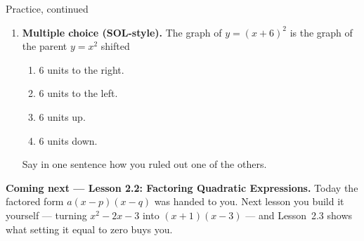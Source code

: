 \documentclass[12pt]{article}
\begin{document}
\begin{notesbox}{Practice, continued}
\begin{enumerate}[leftmargin=1.9em, itemsep=8pt, start=4]
  \item \textbf{Multiple choice (SOL-style).} The graph of $y=(x+6)^2$ is the graph of the parent
        $y=x^2$ shifted
    \begin{enumerate}[label=\Alph*., leftmargin=2.2em, itemsep=1pt]
      \item $6$ units to the right.
      \item $6$ units to the left.
      \item $6$ units up.
      \item $6$ units down.
    \end{enumerate}
    Say in one sentence how you ruled out one of the others. 
\end{enumerate}
\end{notesbox}

\vspace{0.06in}

\boxguard[6]
\begin{spiralbox}
\small
\textbf{Coming next --- Lesson 2.2: Factoring Quadratic Expressions.} Today the factored form
$a(x-p)(x-q)$ was handed to you. Next lesson you build it yourself --- turning $x^2-2x-3$ into
$(x+1)(x-3)$ --- and Lesson~2.3 shows what setting it equal to zero buys you.
\end{spiralbox}
\end{document}
